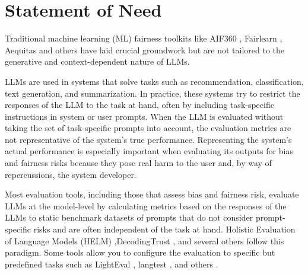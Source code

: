 \documentclass[
]{article}
\begin{document}
\section{Statement of Need}
Traditional machine learning (ML) fairness toolkits like AIF360 \cite{aif360-oct-2018}, Fairlearn \cite{Weerts_Fairlearn_Assessing_and_2023}, Aequitas \cite{2018aequitas} and others \cite{lift,DBLP:journals/corr/abs-1907-04135,tensorflow-no-date} have laid crucial groundwork but are not tailored to the generative and context-dependent nature of LLMs.

LLMs are used in systems that solve tasks such as recommendation, classification, text generation, and summarization. In practice, these systems try to restrict the responses of the LLM to the task at hand, often by including task-specific instructions in system or user prompts. When the LLM is evaluated without taking the set of task-specific prompts into account, the evaluation metrics are not representative of the system's true performance. Representing the system's actual performance is especially important when evaluating its outputs for bias and fairness risks because they pose real harm to the user and, by way of repercussions, the system developer.

Most evaluation tools, including those that assess bias and fairness risk, evaluate LLMs at the model-level by calculating metrics based on the responses of the LLMs to static benchmark datasets of prompts \cite{rudinger-EtAl:2018:N18,zhao-2018,vnmssnhv-no-date,webster2018gap, levy2021collecting,nadeem2020stereoset,bartl2020unmasking,nangia2020crows,katyfelkner-no-date,umanlp-no-date,unknown-author-no-date,dev2019measuring,Gehman2020RealToxicityPromptsEN,bold_2021,smith2022imsorry,howiehwong-no-date,nozza-etal-2021-honest,nyu-mll-no-date,li2020unqover,krieg2022grep} that do not consider prompt-specific risks and are often independent of the task at hand. Holistic Evaluation of Language Models (HELM) \cite{liang2023holisticevaluationlanguagemodels},DecodingTrust \cite{wang2023decodingtrust}, and several others \cite{srivastava2023beyond,huang2024trustllm,eval-harness} follow this paradigm. Some tools allow you to configure the evaluation to specific but predefined tasks such as LightEval \cite{lighteval}, langtest \cite{Arshaan_Nazir_and_Thadaka_Kalyan_Chakravarthy_and_David_Amore_Cecchini_and_Thadaka_Kalyan_Chakravarthy_and_Rakshit_Khajuria_and_Prikshit_Sharma_and_Ali_Tarik_Mirik_and_Veysel_Kocaman_and_David_Talby_LangTest_A_comprehensive_2024}, and others \cite{confident-ai-no-date,giskard-ai-no-date,huggingface-no-date}. 
\end{document}
